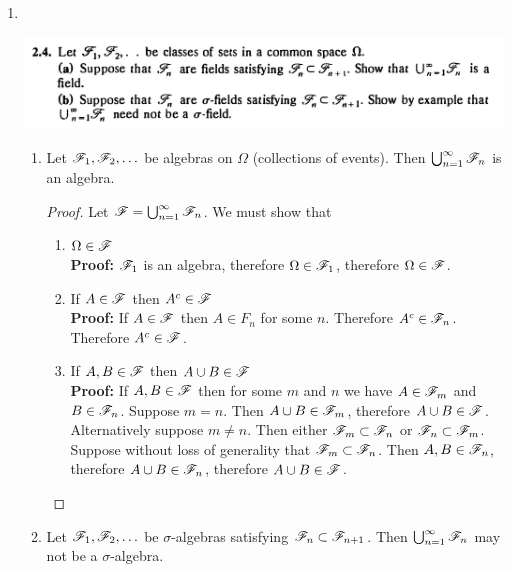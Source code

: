 \begin{enumerate}
\item~\\
  \begin{mdframed}
    \includegraphics[width=400pt]{img/analysis--berkeley-202a-hw-e32d.png}
  \end{mdframed}
  \begin{enumerate}[label=(\alph*)]
  \item
    \begin{claim*}
      Let $\mathscr F_1, \mathscr F_2, \ldots$ be algebras on $\Omega$ (collections of events).
      Then $\bigcup_{n=1}^\infty \mathscr{F}_n$ is an algebra.
    \end{claim*}

    \begin{proof}
      Let $\mathscr F = \bigcup_{n=1}^\infty \mathscr F_n$. We must show that
      \begin{enumerate}
      \item $\Omega \in \mathscr F$ \\
        {\bf Proof:} $\mathscr F_1$ is an algebra, therefore $\Omega \in \mathscr F_1$, therefore $\Omega \in \mathscr F$.
      \item If $A \in \mathscr F$ then $A^c \in \mathscr F$ \\
        {\bf Proof:} If $A \in \mathscr F$ then $A \in F_n$ for some $n$. Therefore $A^c \in \mathscr F_n$. Therefore $A^c \in \mathscr F$.
      \item If $A, B \in \mathscr F$ then $A \cup B \in \mathscr F$ \\
        {\bf Proof:} If $A, B \in \mathscr F$ then for some $m$ and $n$ we have $A \in \mathscr F_m$ and $B \in \mathscr F_n$.
        Suppose $m = n$. Then $A \cup B \in \mathscr F_m$, therefore $A \cup B \in \mathscr F$. Alternatively
        suppose $m \neq n$. Then either $\mathscr F_m \subset \mathscr F_n$ or $\mathscr F_n \subset \mathscr F_m$. Suppose without
        loss of generality that $\mathscr F_m \subset \mathscr F_n$. Then $A, B \in \mathscr F_n$,
        therefore $A \cup B \in \mathscr F_n$, therefore $A \cup B \in \mathscr F$.
      \end{enumerate}
    \end{proof}
  \item
    \begin{claim*}
      Let $\mathscr F_1, \mathscr F_2, \ldots$ be $\sigma$-algebras satisfying $\mathscr F_n \subset \mathscr F_{n+1}$.
      Then $\bigcup_{n=1}^\infty \mathscr{F}_n$ may not be a $\sigma$-algebra.
    \end{claim*}


\end{enumerate}
\end{enumerate}
